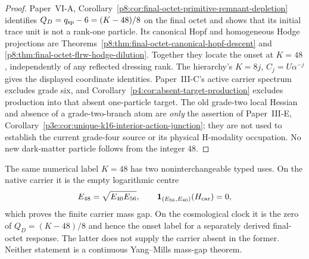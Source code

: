 \documentclass[12pt,a4paper]{article}
\begin{document}
\begin{proof}
Paper~VI-A, Corollary~\ref{p8:cor:final-octet-primitive-remnant-depletion}
identifies \(Q_D=q_{\rm sp}-6=(K-48)/8\) on the final octet and shows that
its initial trace unit is not a rank-one particle. Its canonical Hopf and
homogeneous Hodge projections are Theorems~\ref{p8:thm:final-octet-canonical-hopf-descent}
and \ref{p8:thm:final-octet-flrw-hodge-dilution}. Together they locate the
onset at \(K=48\), independently of any reflected dressing rank.
The hierarchy's \(K=8j\), \(C_j=U\alpha^{-j}\) gives the displayed
coordinate identities. Paper~III-C's active carrier spectrum excludes grade
six, and Corollary~\ref{p4:cor:absent-target-production} excludes production
into that absent one-particle target. The old grade-two local Hessian and
absence of a grade-two-branch atom are \emph{only} the assertion of
Paper~III-E, Corollary~\ref{p3e:cor:unique-k16-interior-action-junction};
they are not used to establish the current grade-four source or its physical
H-modality occupation. No new dark-matter particle follows from the integer
48.\end{proof}

\begin{corollary}
\label{p9:cor:v165-reflected-onset-native-mass-gap}
The same numerical label \(K=48\) has two noninterchangeable typed uses.
On the native carrier it is the empty logarithmic centre
\[
 E_{48}=\sqrt{E_{40}E_{56}},
 \qquad
 \mathbf1_{(E_{56},E_{40})}(H_{\rm car})=0,
\]
which proves the finite carrier mass gap.  On the cosmological clock it is
the zero of \(Q_D=(K-48)/8\) and hence the onset label for a separately
derived final-octet response.  The latter does not supply the carrier absent
in the former.  Neither statement is a continuous Yang--Mills mass-gap
theorem.
\end{corollary}
\end{document}
